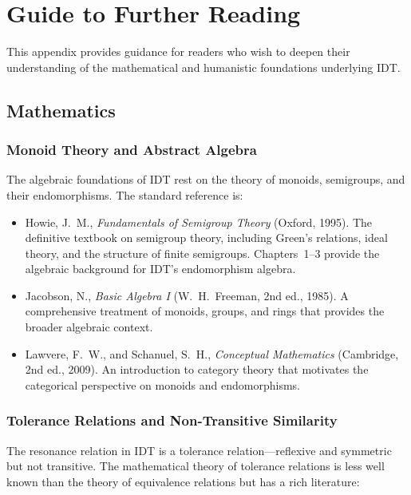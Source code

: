 \documentclass[11pt,openany]{book}
\theoremstyle{definition}
\theoremstyle{plain}
\theoremstyle{remark}
\begin{document}
\chapter{Guide to Further Reading}
\label{app:further-reading}

This appendix provides guidance for readers who wish to deepen their understanding of the mathematical and humanistic foundations underlying IDT.

\section{Mathematics}

\subsection{Monoid Theory and Abstract Algebra}

The algebraic foundations of IDT rest on the theory of monoids, semigroups, and their endomorphisms. The standard reference is:

\begin{itemize}
\item Howie, J.~M., \textit{Fundamentals of Semigroup Theory} (Oxford, 1995). The definitive textbook on semigroup theory, including Green's relations, ideal theory, and the structure of finite semigroups. Chapters~1--3 provide the algebraic background for IDT's endomorphism algebra.
\item Jacobson, N., \textit{Basic Algebra I} (W.~H.~Freeman, 2nd ed., 1985). A comprehensive treatment of monoids, groups, and rings that provides the broader algebraic context.
\item Lawvere, F.~W., and Schanuel, S.~H., \textit{Conceptual Mathematics} (Cambridge, 2nd ed., 2009). An introduction to category theory that motivates the categorical perspective on monoids and endomorphisms.
\end{itemize}

\subsection{Tolerance Relations and Non-Transitive Similarity}

The resonance relation in IDT is a tolerance relation---reflexive and symmetric but not transitive. The mathematical theory of tolerance relations is less well known than the theory of equivalence relations but has a rich literature:
\end{document}
